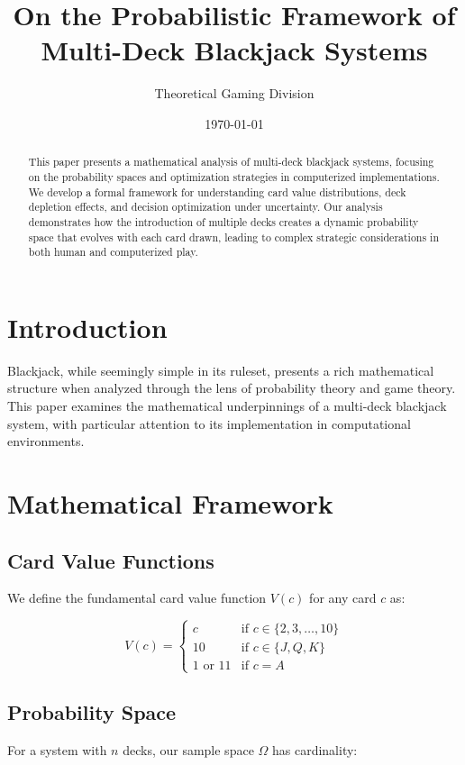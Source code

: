 \documentclass{article}
\title{On the Probabilistic Framework of Multi-Deck Blackjack Systems}
\author{Theoretical Gaming Division}
\date{\today}
\begin{document}
\maketitle

\begin{abstract}
This paper presents a mathematical analysis of multi-deck blackjack systems, focusing on the probability spaces and optimization strategies in computerized implementations. We develop a formal framework for understanding card value distributions, deck depletion effects, and decision optimization under uncertainty. Our analysis demonstrates how the introduction of multiple decks creates a dynamic probability space that evolves with each card drawn, leading to complex strategic considerations in both human and computerized play.
\end{abstract}

\section{Introduction}
Blackjack, while seemingly simple in its ruleset, presents a rich mathematical structure when analyzed through the lens of probability theory and game theory. This paper examines the mathematical underpinnings of a multi-deck blackjack system, with particular attention to its implementation in computational environments.

\section{Mathematical Framework}
\subsection{Card Value Functions}
We define the fundamental card value function \( V(c) \) for any card \( c \) as:

\[
V(c) =
\begin{cases} 
    c & \text{if } c \in \{2,3,\ldots,10\} \\
    10 & \text{if } c \in \{J,Q,K\} \\
    1 \text{ or } 11 & \text{if } c = A
\end{cases}
\]

\subsection{Probability Space}
For a system with \( n \) decks, our sample space \( \Omega \) has cardinality:
\end{document}
